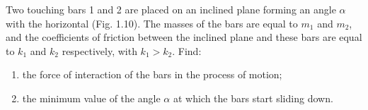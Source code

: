 \item Two touching bars 1 and 2 are placed on an inclined plane forming an angle \(\alpha\) with the horizontal (Fig. 1.10). The masses of the bars are equal to \(m_1\) and \(m_2\), and the coefficients of friction between the inclined plane and these bars are equal to \(k_1\) and \(k_2\) respectively, with \(k_1 > k_2\). Find:
    \begin{center}
    \end{center}
    \begin{enumerate}
        \item the force of interaction of the bars in the process of motion;
        \item the minimum value of the angle \(\alpha\) at which the bars start sliding down.
    \end{enumerate}